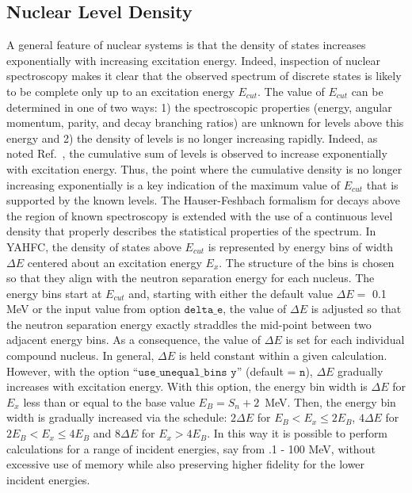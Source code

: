 \documentclass[
10pt,
showpacs,preprintnumbers,footinbib,
amsfonts,amsmath,amssymb,
aps,
prc,twocolumn,groupedaddress,superscriptaddress,
showkeys,
nofootinbib
]{revtex4-1}
\begin{document}
\subsection{Nuclear Level Density}
\label{sec:LD}

A general feature of nuclear systems is that the density of states increases exponentially with increasing excitation energy. Indeed, inspection of nuclear spectroscopy makes it clear that the observed spectrum of discrete states is likely to be complete only up to an excitation energy $E_{cut}$. The value of $E_{cut}$ can be determined in one of two ways: 1) the spectroscopic properties (energy, angular momentum, parity, and decay branching ratios) are unknown for levels above this energy and 2) the density of levels is no longer increasing rapidly. 
Indeed, as noted Ref.~\cite{Gilbert:1965}, the cumulative sum of levels is observed to increase exponentially with excitation energy. Thus, the point where the cumulative density is no longer increasing exponentially is a key indication of the maximum value of $E_{cut}$ that is supported by the known levels.
The Hauser-Feshbach formalism for decays above the region of known spectroscopy is extended with the use of a continuous level density that properly describes the statistical properties of the spectrum. In YAHFC, the density of states above $E_{cut}$ is represented by energy bins of width 
$\Delta E$ centered about an excitation energy $E_x$. The structure of the bins is chosen so that they align with the neutron separation energy for each nucleus. The energy bins start at $E_{cut}$ and, starting with either the default value $\Delta E = $ 0.1 MeV or the input value from option 
${\texttt{delta\_e}}$, the value of $\Delta E$ is adjusted so that the neutron separation energy exactly straddles the mid-point between two adjacent energy bins. As a consequence, the value of $\Delta E$ is set for each individual compound nucleus. In general, $\Delta E$ is held constant within a given calculation. However, with the option 
``${\texttt{use\_unequal\_bins y}}$'' (default = ${\texttt{n}}$), $\Delta E$ gradually increases with excitation energy. With this option, the energy bin width is $\Delta E$ for $E_x$ less than or equal to the base value $E_B = S_n + 2$~MeV. Then, the energy bin width is gradually increased via the schedule: $2\Delta E$ for $E_B < E_x \le 2E_B$, $4\Delta E$ for $2E_B < E_x \le 4E_B$ and $8\Delta E$ for $E_x > 4E_B$. In this way it is possible to perform calculations for a range of incident energies, say from .1 - 100 MeV, without excessive use of memory while also preserving higher fidelity for the lower incident energies.
\end{document}
